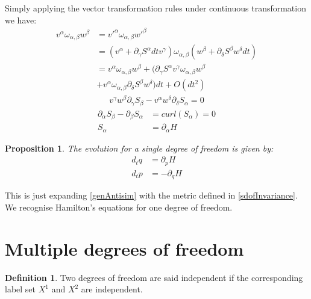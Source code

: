 \documentclass[twocolumn,floatfix,nofootinbib]{revtex4}   %
\theoremstyle{theorem}
\newtheorem{prop}[thm]{Proposition}
\theoremstyle{definition}
\newtheorem{defn}[thm]{Definition}
\begin{document}
Simply applying the vector transformation rules under continuous transformation we have:
\begin{align*}
v^{\alpha} \omega_{\alpha, \beta} w^{\beta} &= v'^{\alpha} \omega_{\alpha, \beta} w'^{\beta}  \\
&= (v^{\alpha} + \partial_{\gamma} S^{\alpha} dt v^{\gamma}) \omega_{\alpha, \beta} ( w^{\beta} + \partial_{\delta} S^{\beta} w^{\delta} dt) \\
&= v^{\alpha} \omega_{\alpha, \beta} w^{\beta} + (\partial_{\gamma} S^{\alpha} v^{\gamma} \omega_{\alpha, \beta} w^{\beta} \\
 &+ v^{\alpha} \omega_{\alpha, \beta} \partial_{\delta} S^{\beta} w^{\delta}) dt + O(dt^2)
\end{align*}
\begin{align*}
v^{\gamma} w^{\beta} \partial_{\gamma} S_{\beta} - v^{\alpha} w^{\delta} \partial_{\delta} S_{\alpha} = 0
\end{align*}
\begin{align*}
\partial_{\alpha} S_{\beta} - \partial_{\beta} S_{\alpha} &= curl(S_{\alpha}) = 0 \\
S_{\alpha} &= \partial_{\alpha}H
\end{align*}

\begin{prop}\label{sdofHam}
The evolution for a single degree of freedom is given by:
\begin{align*}
d_{t}q &= \partial_{p} H \\
d_{t}p &= - \partial_{q} H
\end{align*}
\end{prop}

This is just expanding \ref{genAntisim} with the metric defined in \ref{sdofInvariance}. We recognise Hamilton's equations for one degree of freedom.

\section{Multiple degrees of freedom}

\begin{defn}\label{mdof}
Two degrees of freedom are said independent if the corresponding label set $X^1$ and $X^2$ are independent.
\end{defn}
\end{document}

